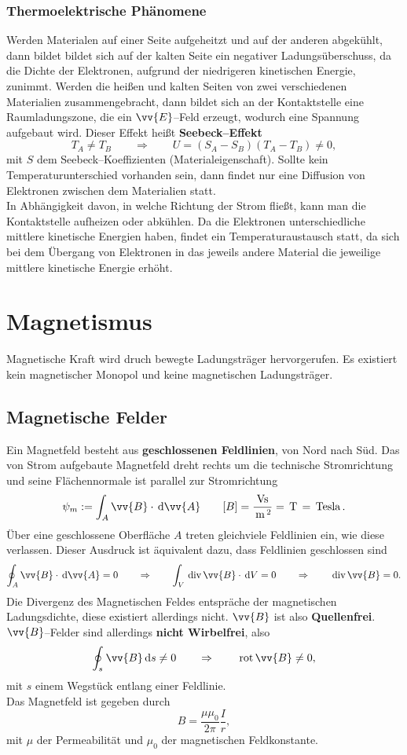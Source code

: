 \documentclass[a4paper,12pt]{article}
\newcommand{\td}{\,\text{d}}
\begin{document}
\subsubsection{Thermoelektrische Phänomene}
Werden Materialen auf einer Seite aufgeheitzt und auf der anderen abgekühlt, dann bildet bildet sich auf der kalten Seite ein negativer Ladungsüberschuss, da die Dichte der Elektronen, aufgrund der niedrigeren kinetischen Energie, zunimmt. Werden die heißen und kalten Seiten von zwei verschiedenen Materialien zusammengebracht, dann bildet sich an der Kontaktstelle eine Raumladungszone, die ein $\vv{E}$--Feld erzeugt, wodurch eine Spannung aufgebaut wird. Dieser Effekt heißt \textbf{Seebeck--Effekt}
\[ 
        T_A\neq T_B\qquad \Rightarrow \qquad U=\left(S_A-S_B\right)\left(T_A-T_B\right)\neq 0
,\] 
mit $S$ dem Seebeck--Koeffizienten (Materialeigenschaft). Sollte kein Temperaturunterschied vorhanden sein, dann findet nur eine Diffusion von Elektronen zwischen dem Materialien statt.\\\indent
In Abhängigkeit davon, in welche Richtung der Strom fließt, kann man die Kontaktstelle aufheizen oder abkühlen. Da die Elektronen unterschiedliche mittlere kinetische Energien haben, findet ein Temperaturaustausch statt, da sich bei dem Übergang von Elektronen in das jeweils andere Material die jeweilige mittlere kinetische Energie erhöht.

\newpage
\section{Magnetismus}
Magnetische Kraft wird druch bewegte Ladungsträger hervorgerufen. Es existiert kein magnetischer Monopol und keine magnetischen Ladungsträger. 

\subsection{Magnetische Felder}
Ein Magnetfeld besteht aus \textbf{geschlossenen Feldlinien}, von Nord nach Süd. Das von Strom aufgebaute Magnetfeld dreht rechts um die technische Stromrichtung und seine Flächennormale ist parallel zur Stromrichtung
\[ 
        \psi _m:=\int_{A}^{}\vv{B}\cdot \td \vv{A}\qquad [B]=\dfrac{\,\text{Vs}\,}{\,\text{m}\,^2}=\,\text{T}\,=\,\text{Tesla}\,
.\] 
Über eine geschlossene Oberfläche $A$ treten gleichviele Feldlinien ein, wie diese verlassen. Dieser Ausdruck ist äquivalent dazu, dass Feldlinien geschlossen sind
\[ 
        \oint_{A}^{}\vv{B}\cdot \td \vv{A}=0\qquad \Rightarrow \qquad \int_{V}^{}\,\text{div}\,\vv{B}\cdot \td V=0\qquad \Rightarrow \qquad \,\text{div}\,\vv{B}=0
.\] 
Die Divergenz des Magnetischen Feldes entspräche der magnetischen Ladungsdichte, diese existiert allerdings nicht. $\vv{B}$ ist also \textbf{Quellenfrei}.\\\indent
$\vv{B}$--Felder sind allerdings \textbf{nicht Wirbelfrei}, also
\[ 
        \oint_{s}^{}\vv{B}\td s \neq 0\qquad \Rightarrow \qquad \,\text{rot}\,\vv{B}\neq 0
,\] 
mit $s$ einem Wegstück entlang einer Feldlinie.\\\indent
Das Magnetfeld ist gegeben durch
\[ 
        B=\dfrac{\mu \mu _0}{2\pi }\dfrac{I}{r}
,\] 
mit $\mu $ der Permeabilität und $\mu _0$ der magnetischen Feldkonstante.
\end{document}
